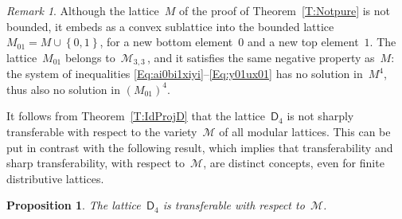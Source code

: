 \documentclass[reqno]{amsart}
\numberwithin{equation}{section}
\theoremstyle{plain}
\newtheorem{proposition}[theorem]{Proposition}
\theoremstyle{definition}
\theoremstyle{remark}
\newtheorem{remark}[theorem]{Remark}
\numberwithin{figure}{section}
\numberwithin{table}{section}
\begin{document}
\begin{remark}\label{Rk:Notpure}
Although the lattice~$M$ of the proof of Theorem~\ref{T:Notpure} is not bounded, it embeds as a convex sublattice into the bounded lattice $M_{01}=M\cup{\left\{{0,1}\right\}}$, for a new bottom element~$0$ and a new top element~$1$.
The lattice~$M_{01}$ belongs to~${\mathcal{M}}_{3,3}$\,, and it satisfies the same negative property as~$M$:
the system of inequalities \eqref{Eq:ai0bi1xiyi}--\eqref{Eq:y01ux01} has no solution in~$M^4$, thus also no solution in $(M_{01})^4$.
\end{remark}

It follows from Theorem~\ref{T:IdProjD} that the lattice~${\mathsf{D}_{4}}$ is not sharply transferable with respect to the variety~${\mathcal{M}}$ of all modular lattices.
This can be put in contrast with the following result, which implies that transferability and sharp transferability, with respect to~${\mathcal{M}}$, are distinct concepts, even for finite distributive lattices.

\begin{proposition}\label{P:D4transf}
The lattice~${\mathsf{D}_{4}}$ is transferable with respect to~${\mathcal{M}}$.
\end{proposition}
\end{document}
